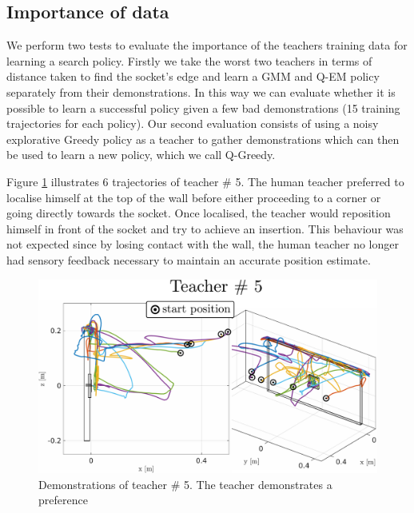 \documentclass[final,3p,times,twocolumn]{elsarticle}
\begin{document}
\subsection{Importance of data}

We perform two tests to evaluate the importance of the teachers training data for learning a search policy. Firstly we take the 
worst two teachers in terms of distance taken to find the socket's edge and learn a GMM and Q-EM policy separately from their 
demonstrations. In this way we can evaluate whether it is possible to learn a successful policy given 
a few bad demonstrations (15 training trajectories for each policy). Our second evaluation consists of using a noisy 
explorative Greedy policy as a teacher to gather demonstrations which can then be used to learn a new policy, which we call Q-Greedy. 

Figure \ref{fig:subj_5_traj} illustrates 6 trajectories of teacher \# 5. The human teacher preferred to
localise himself at the top of the wall before either proceeding to a corner or going directly towards the socket. Once localised, the teacher 
would reposition himself in front of the socket and try to achieve an insertion. This behaviour was not expected 
since by losing contact with the wall, the human teacher no longer had sensory feedback necessary 
to maintain an accurate position estimate.

\begin{figure}
 \centering
    \includegraphics[width=\textwidth]{./Figures/Fig/subject5.pdf}
    \caption{Demonstrations of teacher \# 5. The teacher demonstrates a preference}
    \label{fig:subj_5_traj}
 \end{figure}
 
\end{document}
